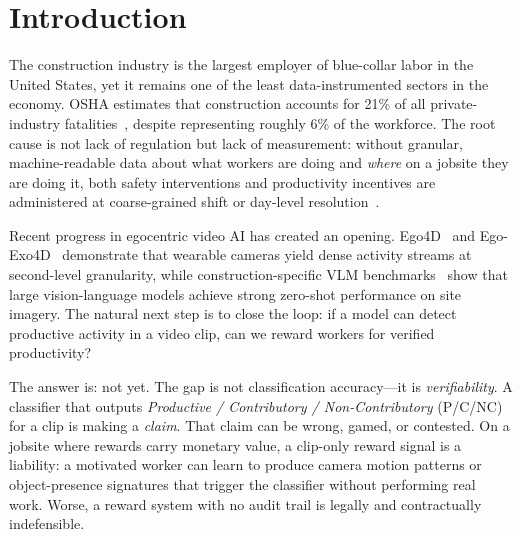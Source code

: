 \documentclass[sigconf,nonacm]{acmart}
\begin{document}

\maketitle

\section{Introduction}
\label{sec:intro}

The construction industry is the largest employer of blue-collar labor in the United States, yet it remains one of the least data-instrumented sectors in the economy.
OSHA estimates that construction accounts for 21\% of all private-industry fatalities~\cite{osha1926}, despite representing roughly 6\% of the workforce.
The root cause is not lack of regulation but lack of measurement: without granular, machine-readable data about what workers are doing and \emph{where} on a jobsite they are doing it, both safety interventions and productivity incentives are administered at coarse-grained shift or day-level resolution~\cite{cii252}.

Recent progress in egocentric video AI has created an opening.
Ego4D~\cite{ego4d} and Ego-Exo4D~\cite{grauman2024egoexo4d} demonstrate that wearable cameras yield dense activity streams at second-level granularity, while construction-specific VLM benchmarks~\cite{chen2025vlm_construction} show that large vision-language models achieve strong zero-shot performance on site imagery.
The natural next step is to close the loop: if a model can detect productive activity in a video clip, can we reward workers for verified productivity?

The answer is: not yet.
The gap is not classification accuracy---it is \emph{verifiability}.
A classifier that outputs \textit{Productive / Contributory / Non-Contributory} (P/C/NC) for a clip is making a \emph{claim}.
That claim can be wrong, gamed, or contested.
On a jobsite where rewards carry monetary value, a clip-only reward signal is a liability: a motivated worker can learn to produce camera motion patterns or object-presence signatures that trigger the classifier without performing real work.
Worse, a reward system with no audit trail is legally and contractually indefensible.
\end{document}

